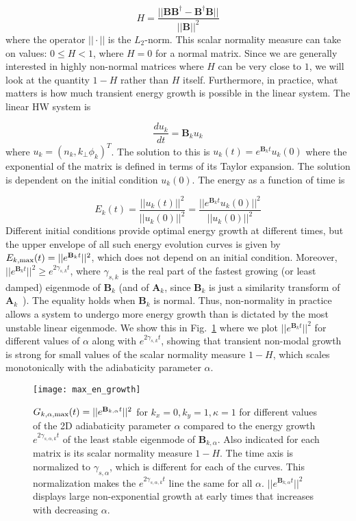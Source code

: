 \documentclass[twocolumn,showkeys,superscriptaddress]{revtex4}
\def\beq{\begin{equation}}
\def\eeq{\end{equation}}
\newcommand{\diff}[2]{\frac{d#1}{d#2}}
\begin{document}
\beq
\label{henrici_num}
H = \frac{||\mathbf{B} \mathbf{B}^\dagger - \mathbf{B}^\dagger \mathbf{B}||}{|| \mathbf{B} ||^2}
\eeq
where the operator $|| \cdot ||$ is the $L_2$-norm. This scalar normality measure can take on values: $0 \le H < 1$, where $H=0$ for a normal matrix. Since we are generally interested in highly non-normal
matrices where $H$ can be very close to $1$, we will look at the quantity $1-H$ rather than $H$ itself. Furthermore, in practice, what matters is how much transient energy growth is possible in the linear
system. The linear HW system is

\beq
\label{lin_HW}
\diff{u_k}{t} = \mathbf{B}_k u_k
\eeq
where $u_k = \left( n_k, k_\perp \phi_k \right)^T$.
The solution to this is $u_k(t) = e^{\mathbf{B}_k t} u_k(0)$ where the exponential of the matrix is defined in terms of
its Taylor expansion. The solution is dependent on the initial condition $u_k(0)$. The energy as a function of time is

\beq
\label{Et}
E_k(t) = \frac{||u_k(t)||^2}{||u_k(0)||^2} = \frac{||e^{\mathbf{B}_k t} u_k(0)||^2}{||u_k(0)||^2}
\eeq
Different initial conditions provide optimal energy growth at different times, but the upper envelope of all such energy evolution curves is given by
$E_{k,\rm{max}}(t) = ||e^{\mathbf{B}_k t}||^2$, which does not depend on an initial condition.
Moreover, $||e^{\mathbf{B}_k t}||^2 \ge e^{2 \gamma_{s,k} t}$, where $\gamma_{s,k}$ is the real part of
the fastest growing (or least damped) eigenmode of $\mathbf{B}_k$ (and of $\mathbf{A}_k$, since $\mathbf{B}_k$ is just a similarity transform of $\mathbf{A}_k$~\cite{camargo1998}). 
The equality holds when $\mathbf{B}_k$ is normal. 
Thus, non-normality in practice allows a system to undergo more energy growth than is dictated by the most unstable linear eigenmode. We show this in Fig.~\ref{max_en_growth} where we plot
$||e^{\mathbf{B}_k t}||^2$ for different values of $\alpha$ along with $e^{2 \gamma_{s,k} t}$, showing that transient non-modal growth is strong for small values of the scalar normality measure $1-H$, which scales monotonically
with the adiabaticity parameter $\alpha$.

\begin{figure}
\centerline{\texttt{[image: max\_en\_growth]}}
\caption{$G_{k,\alpha,\rm{max}}(t) = ||e^{\mathbf{B}_{k,\alpha} t}||^2$ for $k_x=0, k_y=1, \kappa=1$ for different values of the 2D adiabaticity parameter 
$\alpha$ compared to the energy growth $e^{2 \gamma_{s,\alpha,k} t}$ of the least stable eigenmode of  $\mathbf{B}_{k,\alpha}$. Also indicated for each matrix is its scalar normality measure $1-H$.
The time axis is normalized to $\gamma_{s,\alpha}$, which is different for each of the curves. This normalization makes the $e^{2 \gamma_{s,\alpha,k} t}$ line the same for all $\alpha$. 
$||e^{\mathbf{B}_{k,\alpha} t}||^2$ displays large non-exponential growth at early times that increases with decreasing $\alpha$.}
\label{max_en_growth}
\end{figure}
\end{document}
